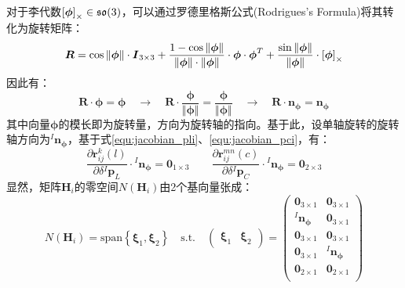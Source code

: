 对于李代数$\left[ \boldsymbol{\phi} \right]_\times\in\mathfrak{so}(3)$，可以通过罗德里格斯公式(Rodrigues's Formula)将其转化为旋转矩阵\cite{高翔2017视觉}：
\begin{equation}
  \boldsymbol{R}=\cos\Vert\boldsymbol{\phi}\Vert\cdot\boldsymbol{I}_{3\times 3}+
  \frac{1-\cos\Vert\boldsymbol{\phi}\Vert}{\Vert\boldsymbol{\phi}\Vert\cdot\Vert\boldsymbol{\phi}\Vert}\cdot\boldsymbol{\phi}\cdot\boldsymbol{\phi}^T
  +\frac{\sin\Vert\boldsymbol{\phi}\Vert}{\Vert\boldsymbol{\phi}\Vert}\cdot\left[ \boldsymbol{\phi} \right]_\times
\end{equation}
因此有：
\begin{equation}
  \label{equ:rot_axis}
  \boldsymbol{R}\cdot\boldsymbol{\phi}=\boldsymbol{\phi}
  \quad\to\quad
  \boldsymbol{R}\cdot\frac{\boldsymbol{\phi}}{\Vert\boldsymbol{\phi}\Vert}=
  \frac{\boldsymbol{\phi}}{\Vert\boldsymbol{\phi}\Vert}
  \quad\to\quad
  \boldsymbol{R}\cdot\boldsymbol{n}_{\boldsymbol{\phi}}=\boldsymbol{n}_{\boldsymbol{\phi}}
\end{equation}
其中向量$\boldsymbol{\phi}$的模长即为旋转量，方向为旋转轴的指向。基于此，设单轴旋转的旋转轴方向为$^{I}\boldsymbol{n}_{\boldsymbol{\phi}}$，基于式\ref{equ:jacobian_pli}、\ref{equ:jacobian_pci}，有：
\begin{equation}
  \frac{\partial \boldsymbol{r}_{ij}^k(l)}{\partial \delta {^{I}\boldsymbol{p}_L}}\cdot{^{I}\boldsymbol{n}_{\boldsymbol{\phi}}}=\boldsymbol{0}_{1\times 3}
  \quad\quad
  \frac{\partial \boldsymbol{r}_{ij}^{mn}(c)}{\partial \delta {^{I}\boldsymbol{p}_C}}
  \cdot{^{I}\boldsymbol{n}_{\boldsymbol{\phi}}}=\boldsymbol{0}_{2\times 3}
\end{equation}
显然，矩阵$\boldsymbol{H}_i$的零空间$N(\boldsymbol{H}_i)$由2个基向量张成：
\begin{equation}
  N(\boldsymbol{H}_i)=\mathrm{span}\left\lbrace
  \boldsymbol{\xi}_1,\boldsymbol{\xi}_2
  \right\rbrace
  \quad\mathrm{s.t.}\quad
  \begin{pmatrix}
    \boldsymbol{\xi}_1 & \boldsymbol{\xi}_2
  \end{pmatrix}=
  \begin{pmatrix}
    \boldsymbol{0}_{3\times 1}               & \boldsymbol{0}_{3\times 1}               \\
    {^{I}\boldsymbol{n}_{\boldsymbol{\phi}}} & \boldsymbol{0}_{3\times 1}               \\
    \boldsymbol{0}_{3\times 1}               & \boldsymbol{0}_{3\times 1}               \\
    \boldsymbol{0}_{3\times 1}               & {^{I}\boldsymbol{n}_{\boldsymbol{\phi}}} \\
    \boldsymbol{0}_{2\times 1}               & \boldsymbol{0}_{2\times 1}               \\
  \end{pmatrix}
\end{equation}

